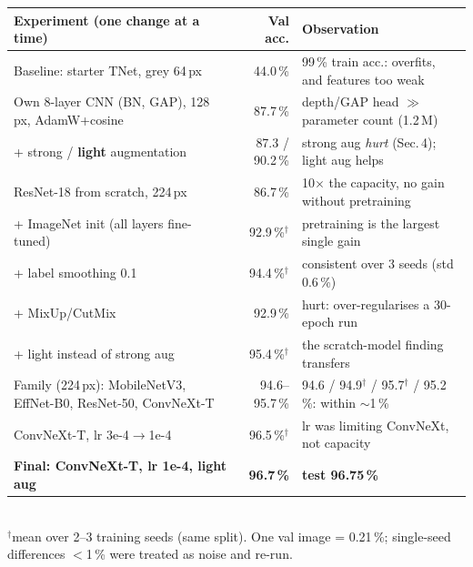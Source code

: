 \documentclass[10pt]{article}
\newcommand{\sect}[1]{\vspace{3pt}{\large\bfseries #1}\par\vspace{1pt}}
\begin{document}
\sect{3. Experimental journey}
\vspace{-2pt}
{\small
\begin{tabular}{@{}p{}r p{}@{}}
\toprule
Experiment (one change at a time) & Val acc. & Observation \\ \midrule
Baseline: starter TNet, grey 64\,px & 44.0\,\% & 99\,\% train acc.: overfits, and features too weak \\
Own 8-layer CNN (BN, GAP), 128\,px, AdamW+cosine & 87.7\,\% & depth/GAP head $\gg$ parameter count (1.2\,M) \\
+ strong / \textbf{light} augmentation & 87.3 / 90.2\,\% & strong aug \emph{hurt} (Sec.\,4); light aug helps \\
ResNet-18 from scratch, 224\,px & 86.7\,\% & 10$\times$ the capacity, no gain without pretraining \\
+ ImageNet init (all layers fine-tuned) & 92.9\,\%$^\dagger$ & pretraining is the largest single gain \\
+ label smoothing 0.1 & 94.4\,\%$^\dagger$ & consistent over 3 seeds (std 0.6\,\%) \\
+ MixUp/CutMix & 92.9\,\% & hurt: over-regularises a 30-epoch run \\
+ light instead of strong aug & 95.4\,\%$^\dagger$ & the scratch-model finding transfers \\
Family (224\,px): MobileNetV3, EffNet-B0, ResNet-50, ConvNeXt-T & 94.6--95.7\,\% & 94.6 / 94.9$^\dagger$ / 95.7$^\dagger$ / 95.2\,\%: within $\sim$1\,\% \\
ConvNeXt-T, lr 3e-4$\to$1e-4 & 96.5\,\%$^\dagger$ & lr was limiting ConvNeXt, not capacity \\
\textbf{Final: ConvNeXt-T, lr 1e-4, light aug} & \textbf{96.7\,\%} & \textbf{test 96.75\,\%} \\ \bottomrule
\end{tabular}}\\[1pt]
{\footnotesize $^\dagger$mean over 2--3 training seeds (same split). One val image = 0.21\,\%; single-seed differences $<$1\,\% were treated as noise and re-run.}
\end{document}
